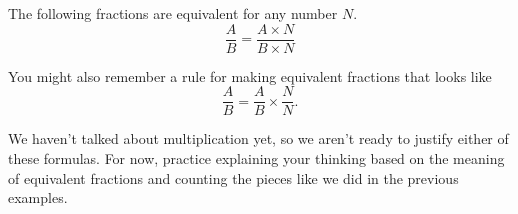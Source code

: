 \documentclass{ximera}
\begin{document}
\begin{theorem}
	The following fractions are equivalent for any number $N$.
	\[
	\frac{A}{B} = \frac{A \times N}{B \times N}
	\]
\end{theorem}

You might also remember a rule for making equivalent fractions that looks like
\[
\frac{A}{B} = \frac{A}{B} \times \frac{N}{N}.
\]

We haven't talked about multiplication yet, so we aren't ready to justify either of these formulas. For now, practice explaining your thinking based on the meaning of equivalent fractions and counting the pieces like we did in the previous examples.
\end{document}
